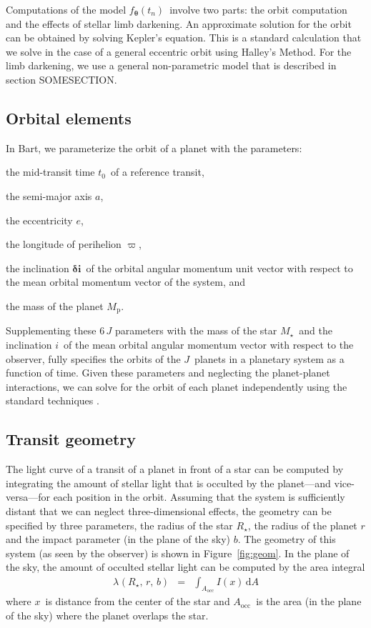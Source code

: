 \documentclass[12pt,preprint]{aastex}
\newcommand{\project}[1]{{\sffamily #1}}
\newcommand{\bart}{\project{Bart}}
\newcommand{\Fig}[1]{Figure~\ref{fig:#1}}
\newcommand{\fig}[1]{\Fig{#1}}
\newcommand{\eqlabel}[1]{\label{eq:#1}}
\newcommand{\dd}{\ensuremath{\,\mathrm{d}}}
\newcommand{\bvec}[1]{\ensuremath{\boldsymbol{#1}}}
\newcommand{\model}{\ensuremath{\bvec{\theta}}}
\newcommand{\tobs}{\ensuremath{t_n}}
\newcommand{\fmodel}{\ensuremath{f_{\model} (\tobs)}}
\newcommand{\rstar}{\ensuremath{R_\star}}
\newcommand{\rplanet}{\ensuremath{r}}
\newcommand{\impactpar}{\ensuremath{b}}
\newcommand{\occbase}[2]{\ensuremath{\lambda_{#1}(#2,\,\rplanet,\,\impactpar)}}
\newcommand{\occ}[1]{\occbase{#1}{\rstar}}
\newcommand{\occultation}{\occ{}}
\newcommand{\rsurface}{\ensuremath{x}}
\newcommand{\ldp}{\ensuremath{I(\rsurface)}}
\newcommand{\occarea}{\ensuremath{A_\mathrm{occ}}}
\newcommand{\nplanets}{\ensuremath{J}}
\newcommand{\tzero}{\ensuremath{{t_0}}}
\newcommand{\smaxis}{\ensuremath{a}}
\newcommand{\ecc}{\ensuremath{e}}
\newcommand{\pomega}{\ensuremath{\varpi}}
\newcommand{\incl}{\ensuremath{\bvec{\delta i}}}
\newcommand{\mplanet}{\ensuremath{{M_\mathrm{p}}}}
\newcommand{\mstar}{\ensuremath{M_\star}}
\newcommand{\iobs}{\ensuremath{i}}
\begin{document}
Computations of the model \fmodel\ involve two parts: the
orbit computation and the effects of stellar limb darkening.
An approximate solution for the orbit can be obtained by solving Kepler's
equation.
This is a standard calculation that we solve in the case of a general
eccentric orbit using Halley's Method.
For the limb darkening, we use a general non-parametric model that is
described in section SOMESECTION.


\subsection{Orbital elements}

In \bart, we parameterize the orbit of a planet with the parameters:
\begin{itemize}
    {\item the mid-transit time \tzero\ of a reference transit,}
    {\item the semi-major axis \smaxis,}
    {\item the eccentricity \ecc,}
    {\item the longitude of perihelion \pomega,}
    {\item the inclination \incl\ of the orbital angular momentum unit
           vector with respect to the mean orbital momentum vector of the
           system, and}
    {\item the mass of the planet \mplanet.}
\end{itemize}
Supplementing these $6\,\nplanets$ parameters with the mass of the star
\mstar\ and the inclination \iobs\ of the mean orbital angular momentum vector
with respect to the observer, fully specifies the orbits of the
\nplanets\ planets in a planetary system as a function of time.
Given these parameters and neglecting the planet-planet interactions, we can
solve for the orbit of each planet independently using the standard techniques
\citep[see][for example]{goldstein}.


\subsection{Transit geometry}

The light curve of a transit of a planet in front of a star can be computed by
integrating the amount of stellar light that is occulted by the planet---and
vice-versa---for each position in the orbit.
Assuming that the system is sufficiently distant that we can neglect
three-dimensional effects, the geometry can be specified by three parameters,
the radius of the star \rstar, the radius of the planet \rplanet and the
impact parameter (in the plane of the sky) \impactpar.
The geometry of this system (as seen by the observer) is shown in \fig{geom}.
In the plane of the sky, the amount of occulted stellar light can be computed
by the area integral
\begin{eqnarray}\eqlabel{general-occ}
    \occultation & = & \int_{\occarea} \ldp \dd A
\end{eqnarray}
where \rsurface\ is distance from the center of the star and \occarea\ is
the area (in the plane of the sky) where the planet overlaps the star.
\end{document}
